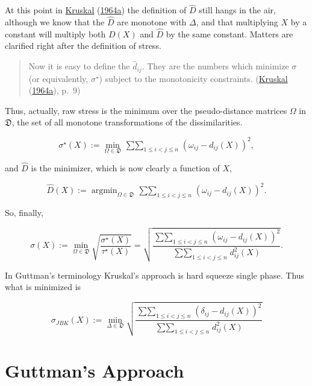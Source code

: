 \documentclass[
  12pt,
]{book}
\theoremstyle{definition}
\theoremstyle{definition}
\theoremstyle{definition}
\theoremstyle{definition}
\theoremstyle{remark}
\begin{document}
At this point in \protect\hyperlink{ref-kruskal_64a}{Kruskal} (\protect\hyperlink{ref-kruskal_64a}{1964a}) the definition of \(\hat D\) still hangs in the
air, although we know that the \(\hat D\) are monotone with \(\Delta\), and that multiplying \(X\) by a constant will multiply
both \(D(X)\) and \(\hat D\) by the same constant. Matters are clarified
right after the definition of stress.

\begin{quote}
Now it is easy to define the \(\hat d_{ij}\). They are the numbers which
minimize \(\sigma\) (or equivalently, \(\sigma^\star\)) subject to the
monotonicity constraints. (\protect\hyperlink{ref-kruskal_64a}{Kruskal} (\protect\hyperlink{ref-kruskal_64a}{1964a}), p.~9)
\end{quote}

Thus, actually, raw stress is the minimum over the pseudo-distance matrices
\(\Omega\) in \(\mathfrak{D}\), the set of all monotone transformations of the dissimilarities.

\begin{equation}
\sigma^\star(X):=\min_{\Omega\in\mathfrak{D}}\mathop{\sum\sum}_{1\leq i<j\leq n} (\omega_{ij}-d_{ij}(X))^2,
\label{eq:rawstressfinal}
\end{equation}

and \(\hat D\) is the minimizer, which is now clearly a function of \(X\),

\begin{equation}
\hat D(X):=\mathop{\text{argmin}}_{\Omega\in\mathfrak{D}}\mathop{\sum\sum}_{1\leq i<j\leq n} (\omega_{ij}-d_{ij}(X))^2.
\label{eq:dhatdef}
\end{equation}

So, finally,

\begin{equation}
\sigma(X):=\min_{\Omega\in\mathfrak{D}}\sqrt{\frac{\sigma^\star(X)}{\tau^\star(X)}}=\sqrt{\frac{\mathop{\sum\sum}_{1\leq i<j\leq n} (\omega_{ij}-d_{ij}(X))^2}{\mathop{\sum\sum}_{1\leq i<j\leq n} d_{ij}^2(X)}}.
\label{eq:kruskalstressfinal}
\end{equation}

In Guttman's terminology Kruskal's approach is hard squeeze single phase.
Thus what is minimized is

\[
\sigma_{JBK}^{\ }(X):=\min_{ \Delta\in\mathfrak{D}}\sqrt{\frac{\mathop{\sum\sum}_{1\leq i<j\leq n}(\delta_{ij}-d_{ij}(X))^2}{\mathop{\sum\sum}_{1\leq i<j\leq n}d_{ij}^2(X)}}
\]

\hypertarget{nmdsguttman}{%
\section{Guttman's Approach}\label{nmdsguttman}}
\end{document}
